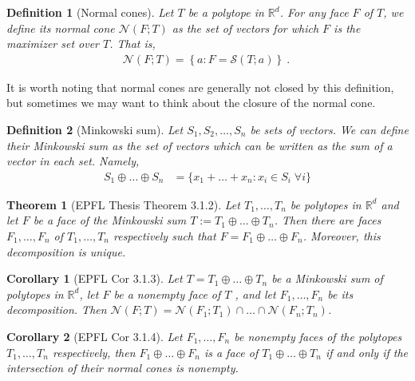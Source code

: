\documentclass[12pt]{article}
\newcommand{\reals}{\mathbb{R}}
\newcommand{\N}{\mathcal{N}}
\newtheorem{theorem}{Theorem}
\newtheorem{definition}{Definition}
\newtheorem{corollary}{Corollary}
\begin{document}
\begin{definition}[Normal cones]
  Let $T$ be a polytope in $\reals^d$.
  For any face $F$ of $T$, we define its \emph{normal cone} $\N(F;T)$ as the set of vectors for which $F$ is the maximizer set over $T$.
  That is,
  \begin{align*}
    \N(F;T) = \left\{a : F = \mathcal{S}(T; a) \right\}~.~
  \end{align*}
\end{definition}

  It is worth noting that normal cones are generally not closed by this definition, but sometimes we may want to think about the closure of the normal cone.

\begin{definition}[Minkowski sum]
	Let $S_1, S_2, \ldots, S_n$ be sets of vectors.
	We can define their \emph{Minkowski sum} as the set of vectors which can be written as the sum of a vector in each set.
	Namely,
	\begin{align*}
	S_1 \oplus \ldots \oplus S_n &= \{x_1 + \ldots + x_n : x_i \in S_i \; \forall i \}
	\end{align*}
\end{definition}

\begin{theorem}[EPFL Thesis Theorem 3.1.2]\label{thm:unique-face-decomp}
	Let $T_1, \ldots, T_n$ be polytopes in $\reals^d$ and let $F$ be a face of the Minkowski sum $T := T_1 \oplus \ldots \oplus T_n$.
	Then there are faces $F_1, \ldots, F_n$ of $T_1, \ldots, T_n$ respectively such that $F = F_1 \oplus \ldots \oplus F_n$.
	Moreover, this decomposition is unique.
\end{theorem}

\begin{corollary}[EPFL Cor 3.1.3]\label{cor:face-decomp-normal-cones}
  Let $T = T_1 \oplus \ldots \oplus T_n$ be a Minkowski sum of polytopes in $\reals^d$, let $F$ be a nonempty face of $T$ , and let $F_1, \ldots, F_n$ be its decomposition.
  Then $\N(F;T) = \N(F_1;T_1) \cap \ldots \cap \N(F_n; T_n)$.
\end{corollary}

\begin{corollary}[EPFL Cor 3.1.4]
  Let $F_1, \ldots, F_n$ be nonempty faces of the polytopes $T_1, \ldots, T_n$ respectively, then $F_1 \oplus \ldots \oplus F_n$ is a face of $T_1 \oplus \ldots \oplus T_n$ if and only if the intersection of their normal cones is nonempty.
\end{corollary}
\end{document}
